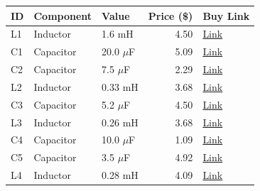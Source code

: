 \begin{table}[H]
    \centering
    \renewcommand{\arraystretch}{1.5}
    \begin{tabular}{@{}lllrl@{}}
        \toprule
        \textbf{ID} & \textbf{Component} & \textbf{Value} & \textbf{Price (\$)} & \textbf{Buy Link} \\
        \midrule
        L1 & Inductor & 1.6 mH & 4.50 & \href{https://www.soundimports.eu/en/jantzen-audio-000-1703.html}{Link} \\
        C1 & Capacitor & 20.0 $\mu$F & 5.09 & \href{https://www.parts-express.com/Solen-20uF-400V-Polypropylene-Capacitor-027-582}{Link} \\
        C2 & Capacitor & 7.5 $\mu$F & 2.29 & \href{https://www.parts-express.com/Solen-7.5uF-400V-Polypropylene-Capacitor-027-562}{Link} \\
        L2 & Inductor & 0.33 mH & 3.68 & \href{https://www.soundimports.eu/en/jantzen-audio-000-1321.html}{Link} \\
        C3 & Capacitor & 5.2 $\mu$F & 4.50 & \href{https://www.soundimports.eu/en/audyn-q4-5-2-400.html}{Link} \\
        L3 & Inductor & 0.26 mH & 3.68 & \href{https://www.soundimports.eu/en/jantzen-audio-000-1266.html}{Link} \\
        C4 & Capacitor & 10.0 $\mu$F & 1.09 & \href{https://www.parts-express.com/10uF-100V-Non-Polarized-Capacitor-027-340}{Link} \\
        C5 & Capacitor & 3.5 $\mu$F & 4.92 & \href{https://www.soundimports.eu/en/audyn-q6-3-5-600.html}{Link} \\
        L4 & Inductor & 0.28 mH & 4.09 & \href{https://www.soundimports.eu/en/jantzen-audio-000-1590.html}{Link} \\
        \bottomrule
    \end{tabular}
\end{table}
